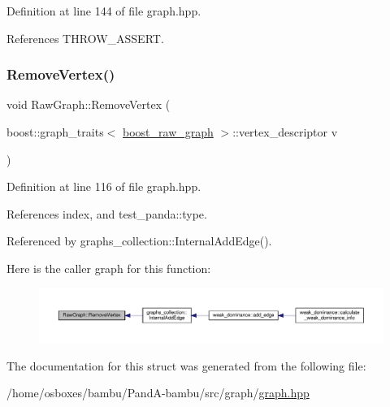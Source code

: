 Definition at line 144 of file graph.\+hpp.



References T\+H\+R\+O\+W\+\_\+\+A\+S\+S\+E\+RT.

\mbox{\label{structRawGraph_ad29ce2e412851ac0b1e9e40aeb8cac1f}} 
\subsubsection{\texorpdfstring{Remove\+Vertex()}{RemoveVertex()}}
{\footnotesize\ttfamily void Raw\+Graph\+::\+Remove\+Vertex (\begin{DoxyParamCaption}\item[{boost\+::graph\+\_\+traits$<$ \hyperlink{graph_8hpp_afdae34b3d2ab29778d96da05f66add5c}{boost\+\_\+raw\+\_\+graph} $>$\+::vertex\+\_\+descriptor}]{v }\end{DoxyParamCaption})\hspace{0.3cm}{\ttfamily [inline]}}



Definition at line 116 of file graph.\+hpp.



References index, and test\+\_\+panda\+::type.



Referenced by graphs\+\_\+collection\+::\+Internal\+Add\+Edge().

Here is the caller graph for this function\+:
\nopagebreak
\begin{figure}[H]
\begin{center}
\leavevmode
\includegraphics[width=350pt]{dc/dd2/structRawGraph_ad29ce2e412851ac0b1e9e40aeb8cac1f_icgraph}
\end{center}
\end{figure}


The documentation for this struct was generated from the following file\+:\begin{DoxyCompactItemize}
\item 
/home/osboxes/bambu/\+Pand\+A-\/bambu/src/graph/\hyperlink{graph_8hpp}{graph.\+hpp}\end{DoxyCompactItemize}

